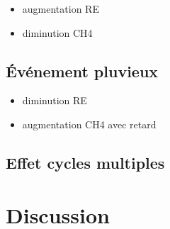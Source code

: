\begin{itemize}
\item augmentation RE
\item diminution CH4
\end{itemize}

\subsection{Événement pluvieux}

\begin{itemize}
\item diminution RE
\item augmentation CH4 avec retard
\end{itemize}

\subsection{Effet cycles multiples}

\section{Discussion}

